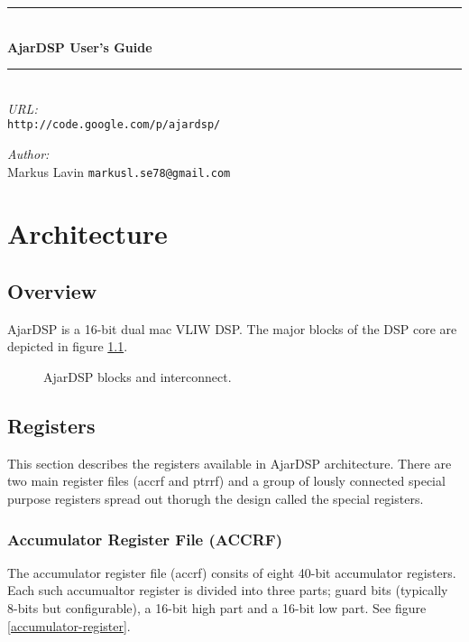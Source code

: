 \documentclass[11pt]{book}
\newcommand{\HRule}{\rule{\linewidth}{0.5mm}}
\begin{document}
\begin{titlepage}
\begin{center}
\HRule \\[0.4cm]
{\Huge \textbf{AjarDSP User's Guide}}\\[0.8cm]
\HRule \\[1.5cm]
\emph{URL:}\\
\texttt{http://code.google.com/p/ajardsp/}\\
\vfill
\begin{flushleft}
\begin{minipage}{0.4\textwidth}
\begin{flushleft} \large
\emph{Author:}\\
Markus Lavin \texttt{markusl.se78@gmail.com}
\end{flushleft}
\end{minipage}
\end{flushleft}
\end{center}
\end{titlepage}

\tableofcontents

\chapter{Architecture}
\section{Overview}
AjarDSP is a 16-bit dual mac VLIW DSP. The major blocks of the DSP
core are depicted in figure \ref{ajardsp-blocks}.
\begin{figure}[!b]
  \caption{\small AjarDSP blocks and interconnect.}
  \label{ajardsp-blocks}
\end{figure}
\section{Registers}
This section describes the registers available in AjarDSP
architecture. There are two main register files (accrf and ptrrf) and
a group of lously connected special purpose registers spread out
thorugh the design called the special registers.
\subsection{Accumulator Register File (ACCRF)}
The accumulator register file (accrf) consits of eight 40-bit
accumulator registers. Each such accumualtor register is divided into
three parts; guard bits (typically 8-bits but configurable), a 16-bit
high part and a 16-bit low part. See figure
\ref{accumulator-register}.  \break
\end{document}
